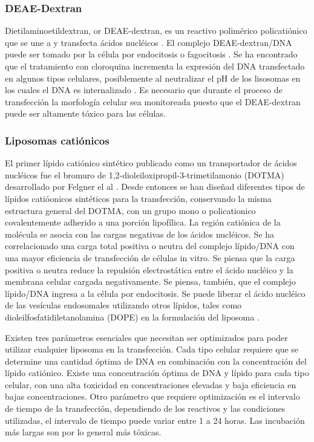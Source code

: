 \documentclass[fleqn,10pt]{SelfArx} %
\begin{document}
\subsubsection*{DEAE-Dextran}
Dietilaminoetildextran, or DEAE-dextran, es un reactivo polimérico policatiónico que se une a y transfecta ácidos nucléicos \cite{McCutchan:1968aa}.  El complejo DEAE-dextran/DNA puede ser tomado por la célula por endocitosis o fagocitosis \cite{Yang:1997aa, Luthman:1983aa}. Se ha encontrado que el tratamiento con cloroquina incrementa la expresión del DNA transfectado en algunos tipos celulares, posiblemente al neutralizar el pH de los lisosomas en los cuales el DNA es internalizado \cite{Luthman:1983aa}. Es necesario que durante el proceso de transfección la morfología celular sea monitoreada puesto que el DEAE-dextran puede ser altamente tóxico para las células.

\subsubsection*{Liposomas catiónicos}
El primer lípido catiónico sintético publicado como un transportador de ácidos nucléicos fue el bromuro de 1,2-dioleiloxipropil-3-trimetilamonio (DOTMA) desarrollado por Felgner el al \cite{Felgner01111987}. Desde entonces se han diseñad diferentes tipos de lípidos catióonicos sintéticos para la transfección, conservando la misma estructura general del DOTMA, con un grupo mono o policationico covalentemente adherido a una porción lipofílica. La región catiónica de la molécula se asocia con las cargas negativas de los ácidos nucléicos. Se ha correlacionado una carga total positiva o neutra del complejo lípido/DNA con una mayor eficiencia de transfección de células in vitro. Se piensa que la carga positiva o neutra reduce la repulsión electrostática entre el ácido nucléico y la membrana celular cargada negativamente. Se piensa, también, que el complejo lípido/DNA ingresa a la célula por endocitosis.  Se puede liberar el ácido nucléico de las vesículas endosomales utilizando otros lípidos, tales como dioleilfosfatidiletanolamina (DOPE) en la formulación del liposoma \cite{Farhood:1995aa}. 

Existen tres parámetros esenciales que necesitan ser optimizados para poder utilizar cualquier liposoma en la transfección. Cada tipo celular requiere que se determine una cantidad óptima de DNA en combinación con la concentración del lípido catiónico. Existe una concentración óptima de DNA y lípido para cada tipo celular, con una alta toxicidad en concentraciones elevadas y baja eficiencia en bajas concentraciones. Otro parámetro que requiere optimización es el intervalo de tiempo de la transfección, dependiendo de los reactivos y las condiciones utilizadas, el intervalo de tiempo puede variar entre 1 a 24 horas. Las incubación más largas son por lo general más tóxicas.
\end{document}
